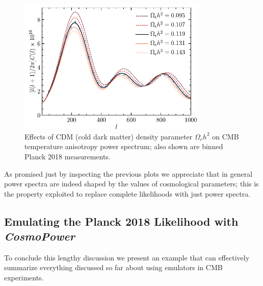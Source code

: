 \begin{figure}[H]
    \centering
    \includegraphics[width=0.8\textwidth]{img/cdm_density.png}
    \caption{Effects of CDM (cold dark matter) density parameter $\Omega_c h^2$ on CMB temperature anisotropy power spectrum; also shown are binned Planck 2018 measurements.}
\end{figure}

As promised just by inspecting the previous plots we appreciate that in general power spectra are indeed shaped by the values of cosmological parameters; this is the property exploited to replace complete likelihoods with just power spectra.


\subsection{Emulating the Planck 2018 Likelihood with \emph{CosmoPower}}
To conclude this lengthy discussion we present an example that can effectively summarize everything discussed so far about using emulators in CMB experiments.

